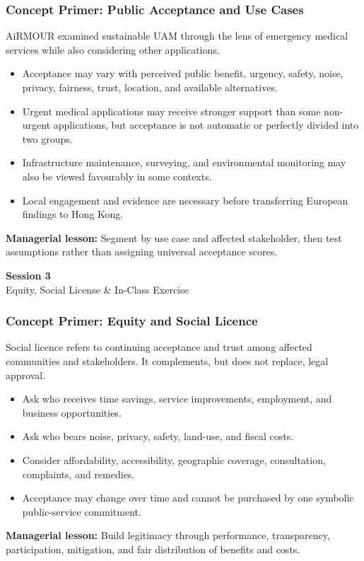 \documentclass{beamer}
\begin{document}
\begin{frame}[t]
\frametitle{Concept Primer: Public Acceptance and Use Cases}
AiRMOUR examined sustainable UAM through the lens of emergency medical services while also considering other applications.
\begin{itemize}
\item Acceptance may vary with perceived public benefit, urgency, safety, noise, privacy, fairness, trust, location, and available alternatives.
\item Urgent medical applications may receive stronger support than some non-urgent applications, but acceptance is not automatic or perfectly divided into two groups.
\item Infrastructure maintenance, surveying, and environmental monitoring may also be viewed favourably in some contexts.
\item Local engagement and evidence are necessary before transferring European findings to Hong Kong.
\end{itemize}
\textbf{Managerial lesson:} Segment by use case and affected stakeholder, then test assumptions rather than assigning universal acceptance scores.
\end{frame}

\begin{frame}[c]
  \begin{center}
    \huge\color{cuhkpurple}\textbf{Session 3}\\
    \vspace{0.5cm}
    \Large Equity, Social License \& In-Class Exercise
  \end{center}
\end{frame}

\begin{frame}[t]
\frametitle{Concept Primer: Equity and Social Licence}
Social licence refers to continuing acceptance and trust among affected communities and stakeholders. It complements, but does not replace, legal approval.
\begin{itemize}
\item Ask who receives time savings, service improvements, employment, and business opportunities.
\item Ask who bears noise, privacy, safety, land-use, and fiscal costs.
\item Consider affordability, accessibility, geographic coverage, consultation, complaints, and remedies.
\item Acceptance may change over time and cannot be purchased by one symbolic public-service commitment.
\end{itemize}
\textbf{Managerial lesson:} Build legitimacy through performance, transparency, participation, mitigation, and fair distribution of benefits and costs.
\end{frame}
\end{document}
